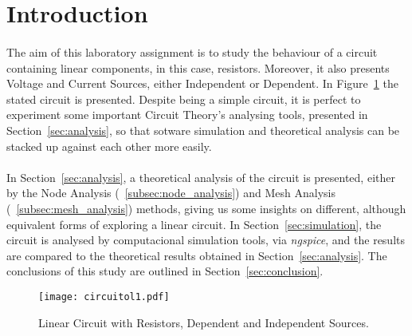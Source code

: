 \section{Introduction}
\label{sec:introduction}

\paragraph{}The aim of this laboratory assignment is to study the behaviour of a circuit containing linear components, in this case, resistors. Moreover, it also presents Voltage and Current Sources, either Independent or Dependent. In Figure~\ref{fig:circuitol1} the stated circuit is presented.
Despite being a simple circuit, it is perfect to experiment some important Circuit Theory's analysing tools, presented in Section~\ref{sec:analysis}, so that sotware simulation and theoretical analysis can be stacked up against each other more easily.

\paragraph{}In Section~\ref{sec:analysis}, a theoretical analysis of the circuit is
presented, either by the Node Analysis (~\ref{subsec:node_analysis}) 
and Mesh Analysis (~\ref{subsec:mesh_analysis}) methods, giving us some insights on different, although equivalent forms of exploring a linear circuit. In Section~\ref{sec:simulation}, the circuit is analysed by computacional simulation tools, via \textit{ngspice}, and the results are compared to the theoretical results obtained in Section~\ref{sec:analysis}. The conclusions of this study are outlined in Section~\ref{sec:conclusion}.

\begin{figure}[h] \centering
\texttt{[image: circuitol1.pdf]}
\caption{Linear Circuit with Resistors, Dependent and Independent Sources.}
\label{fig:circuitol1}
\end{figure}


